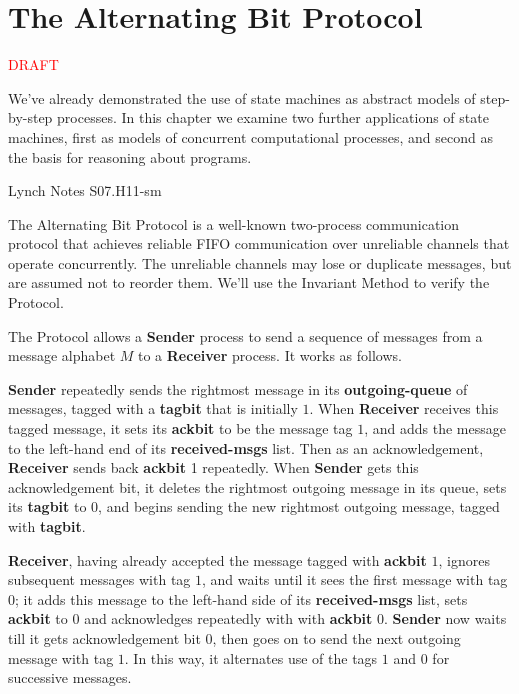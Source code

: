 
\section{The Alternating Bit Protocol}

\begin{center}
{\large \textcolor{red}{DRAFT}}
\end{center}

We've already demonstrated the use of state machines as abstract
models of step-by-step processes.  In this chapter we examine two
further applications of state machines, first as models of concurrent
computational processes, and second as the basis for reasoning about
programs.

\begin{editingnotes}
Lynch Notes S07.H11-sm
\end{editingnotes}

The Alternating Bit Protocol is a well-known two-process communication
protocol that achieves reliable FIFO communication over unreliable
channels that operate concurrently.  The unreliable channels may lose
or duplicate messages, but are assumed not to reorder them.  We'll use
the Invariant Method to verify the Protocol.

The Protocol allows a \textbf{Sender} process to send a sequence of
messages from a message alphabet $M$ to a \textbf{Receiver}
process. It works as follows.

\textbf{Sender} repeatedly sends the rightmost message in its
\textbf{outgoing-queue} of messages, tagged with a \textbf{tagbit}
that is initially $1$.  When \textbf{Receiver} receives this tagged
message, it sets its \textbf{ackbit} to be the message tag $1$, and
adds the message to the left-hand end of its \textbf{received-msgs}
list.  Then as an acknowledgement, \textbf{Receiver} sends back
\textbf{ackbit} 1 repeatedly.  When \textbf{Sender} gets this
acknowledgement bit, it deletes the rightmost outgoing message in its
queue, sets its \textbf{tagbit} to 0, and begins sending the new
rightmost outgoing message, tagged with \textbf{tagbit}.

\textbf{Receiver}, having already accepted the message tagged with
\textbf{ackbit} $1$, ignores subsequent messages with tag $1$, and
waits until it sees the first message with tag $0$; it adds this
message to the left-hand side of its \textbf{received-msgs} list, sets
\textbf{ackbit} to 0 and acknowledges repeatedly with with
\textbf{ackbit} $0$.  \textbf{Sender} now waits till it gets
acknowledgement bit $0$, then goes on to send the next outgoing
message with tag $1$.  In this way, it alternates use of the tags $1$
and $0$ for successive messages.

